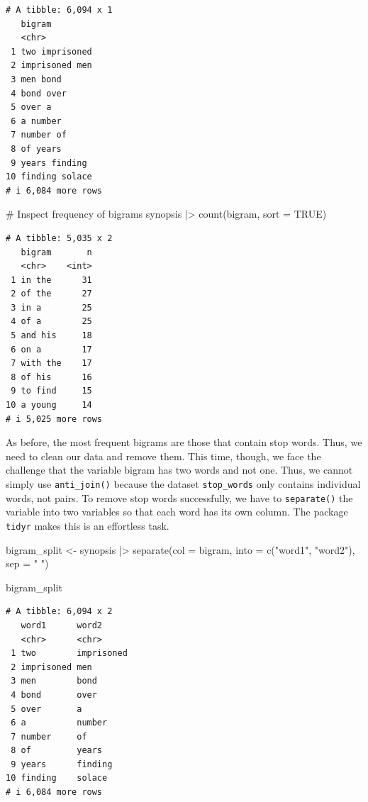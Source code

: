 \documentclass[
  letterpaper,
]{krantz}
\makeatletter
\newenvironment{Shaded}{\begin{snugshade}}{\end{snugshade}}
\newcommand{\AttributeTok}[1]{\textcolor[rgb]{0.40,0.45,0.13}{#1}}
\newcommand{\CommentTok}[1]{\textcolor[rgb]{0.37,0.37,0.37}{#1}}
\newcommand{\ConstantTok}[1]{\textcolor[rgb]{0.56,0.35,0.01}{#1}}
\newcommand{\FunctionTok}[1]{\textcolor[rgb]{0.28,0.35,0.67}{#1}}
\newcommand{\NormalTok}[1]{\textcolor[rgb]{0.00,0.23,0.31}{#1}}
\newcommand{\OtherTok}[1]{\textcolor[rgb]{0.00,0.23,0.31}{#1}}
\newcommand{\SpecialCharTok}[1]{\textcolor[rgb]{0.37,0.37,0.37}{#1}}
\newcommand{\StringTok}[1]{\textcolor[rgb]{0.13,0.47,0.30}{#1}}
\newenvironment{kframe}{%
\medskip{}
\setlength{\fboxsep}{.8em}
 \def\at@end@of@kframe{}%
 \ifinner\ifhmode%
  \def\at@end@of@kframe{\end{minipage}}%
  \begin{minipage}{\columnwidth}%
 \fi\fi%
 \def\FrameCommand##1{\hskip\@totalleftmargin \hskip-\fboxsep
 \colorbox{shadecolor}{##1}\hskip-\fboxsep
     \hskip-\linewidth \hskip-\@totalleftmargin \hskip\columnwidth}%
 \MakeFramed {\advance\hsize-\width
   \@totalleftmargin\z@ \linewidth\hsize
   \@setminipage}}%
 {\par\unskip\endMakeFramed%
 \at@end@of@kframe}
\renewenvironment{Shaded}{\begin{kframe}}{\end{kframe}}
\makeatother
\begin{document}
\begin{verbatim}
# A tibble: 6,094 x 1
   bigram        
   <chr>         
 1 two imprisoned
 2 imprisoned men
 3 men bond      
 4 bond over     
 5 over a        
 6 a number      
 7 number of     
 8 of years      
 9 years finding 
10 finding solace
# i 6,084 more rows
\end{verbatim}

\begin{Shaded}
\begin{Highlighting}[]
\CommentTok{\# Inspect frequency of bigrams}
\NormalTok{synopsis }\SpecialCharTok{|\textgreater{}} \FunctionTok{count}\NormalTok{(bigram, }\AttributeTok{sort =} \ConstantTok{TRUE}\NormalTok{)}
\end{Highlighting}
\end{Shaded}

\begin{verbatim}
# A tibble: 5,035 x 2
   bigram       n
   <chr>    <int>
 1 in the      31
 2 of the      27
 3 in a        25
 4 of a        25
 5 and his     18
 6 on a        17
 7 with the    17
 8 of his      16
 9 to find     15
10 a young     14
# i 5,025 more rows
\end{verbatim}

As before, the most frequent bigrams are those that contain stop words.
Thus, we need to clean our data and remove them. This time, though, we
face the challenge that the variable bigram has two words and not one.
Thus, we cannot simply use \texttt{anti\_join()} because the dataset
\texttt{stop\_words} only contains individual words, not pairs. To
remove stop words successfully, we have to \texttt{separate()} the
variable into two variables so that each word has its own column. The
package \texttt{tidyr} makes this is an effortless task.

\begin{Shaded}
\begin{Highlighting}[]
\NormalTok{bigram\_split }\OtherTok{\textless{}{-}}\NormalTok{ synopsis }\SpecialCharTok{|\textgreater{}}
  \FunctionTok{separate}\NormalTok{(}\AttributeTok{col =}\NormalTok{ bigram,}
           \AttributeTok{into =} \FunctionTok{c}\NormalTok{(}\StringTok{"word1"}\NormalTok{, }\StringTok{"word2"}\NormalTok{),}
           \AttributeTok{sep =} \StringTok{" "}\NormalTok{)}

\NormalTok{bigram\_split}
\end{Highlighting}
\end{Shaded}

\begin{verbatim}
# A tibble: 6,094 x 2
   word1      word2     
   <chr>      <chr>     
 1 two        imprisoned
 2 imprisoned men       
 3 men        bond      
 4 bond       over      
 5 over       a         
 6 a          number    
 7 number     of        
 8 of         years     
 9 years      finding   
10 finding    solace    
# i 6,084 more rows
\end{verbatim}
\end{document}
